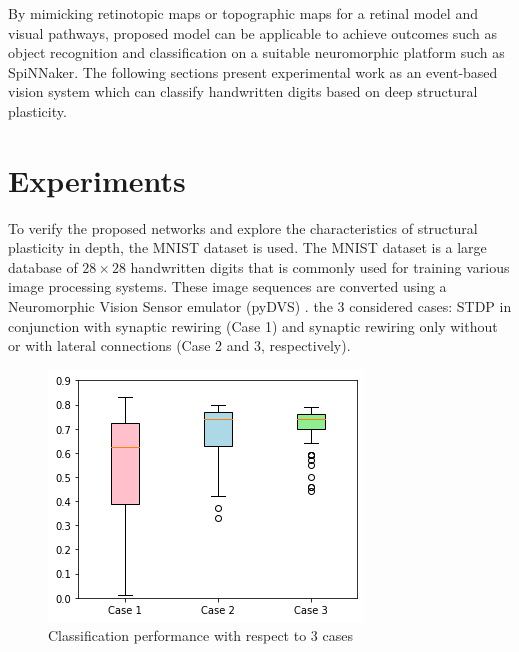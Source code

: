 \documentclass[letterpaper, 10 pt, conference]{ieeeconf}  %
\begin{document}
By mimicking retinotopic maps or topographic maps for a retinal model and visual pathways, proposed model can be applicable to achieve outcomes such as object recognition and classification on a suitable neuromorphic platform such as SpiNNaker.
The following sections present experimental work as an event-based vision system which can classify handwritten digits based on deep structural plasticity.

\section{Experiments}

To verify the proposed networks and explore the characteristics of structural plasticity in depth, the MNIST dataset is used. 
The MNIST dataset is a large database of $28 \times 28$ handwritten digits that is commonly used for training various image processing systems. 
These image sequences are converted using a Neuromorphic Vision Sensor emulator (pyDVS) \cite{garcia2016pydvs}.
the 3 considered cases: STDP in conjunction with synaptic rewiring (Case 1) and synaptic rewiring only without or with lateral connections (Case 2 and 3, respectively).

\begin{figure}[tbh]
    \centering
    \includegraphics[width=0.80\linewidth, trim=0cm 0cm 0cm 0cm, clip=true]{10trials/boxPlotCase}
    \caption{Classification performance with respect to 3 cases}
    \label{fig:bpWCases}
\end{figure}
\end{document}
